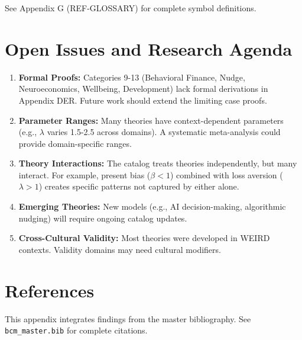 See Appendix G (REF-GLOSSARY) for complete symbol definitions.

\section{Open Issues and Research Agenda}
\label{sec:ms-open-issues}

\begin{enumerate}
    \item \textbf{Formal Proofs:} Categories 9-13 (Behavioral Finance, Nudge,
          Neuroeconomics, Wellbeing, Development) lack formal derivations in
          Appendix DER. Future work should extend the limiting case proofs.

    \item \textbf{Parameter Ranges:} Many theories have context-dependent
          parameters (e.g., $\lambda$ varies 1.5-2.5 across domains). A systematic
          meta-analysis could provide domain-specific ranges.

    \item \textbf{Theory Interactions:} The catalog treats theories independently,
          but many interact. For example, present bias ($\beta < 1$) combined with
          loss aversion ($\lambda > 1$) creates specific patterns not captured
          by either alone.

    \item \textbf{Emerging Theories:} New models (e.g., AI decision-making,
          algorithmic nudging) will require ongoing catalog updates.

    \item \textbf{Cross-Cultural Validity:} Most theories were developed in
          WEIRD contexts. Validity domains may need cultural modifiers.
\end{enumerate}

\section{References}
\label{sec:ms-references}

This appendix integrates findings from the master bibliography.
See \texttt{bcm\_master.bib} for complete citations.

\nocite{bcm_master}

\label{sec:ms-footer}
